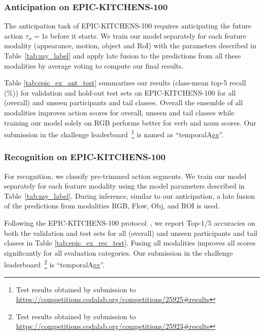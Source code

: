 \documentclass[10pt,twocolumn,letterpaper]{article}
\begin{document}
 
\subsubsection{Anticipation on EPIC-KITCHENS-100}\label{sec:daily_ant}
The anticipation task of EPIC-KITCHENS-100 requires anticipating the future action $\tau_{\alpha}\!=\!1$s before it starts. 
We train our model separately for each feature modality (appearance, motion, object and RoI) with the parameters described in Table~\ref{tab:my_label} and apply late fusion to the predictions from all these modalities by average voting to compute our final results. 


Table \ref{tab:epic_ex_ant_test} summarizes our results (class-mean top-5 recall (\%)) for validation and hold-out test sets on EPIC-KITCHENS-100 for all (overall) and unseen participants and tail classes. 
Overall the ensemble of all modalities improves action scores for overall, unseen and tail classes while training our model solely on RGB performs better for verb and noun scores. 
Our submission in the challenge leaderboard~\footnote{Test results obtained by submission to {\url{https://competitions.codalab.org/competitions/25925\#results}}} is named as ``temporalAgg''. 
 
 
\subsubsection{Recognition on EPIC-KITCHENS-100}\label{sec:daily_rec} 
For recognition, we classify pre-trimmed action segments.
We train our model separately for each feature modality using the model parameters described in Table~\ref{tab:my_label}. 
During inference, similar to our anticipation, a late fusion of the predictions from modalities RGB, Flow, Obj, and ROI is used. 


Following the EPIC-KITCHENS-100 protocol~\cite{damen2020rescaling}, we report Top-1/5 accuracies on both the validation and test sets for all (overall) and unseen participants and tail classes in Table \ref{tab:epic_ex_rec_test}. 
Fusing all modalities improves all scores significantly for all evaluation categories. 
Our submission in the challenge leaderboard~\footnote{Test results obtained by submission to {\url{https://competitions.codalab.org/competitions/25923\#results}}} is ``temporalAgg''. 
 

{\small


}
\end{document}

